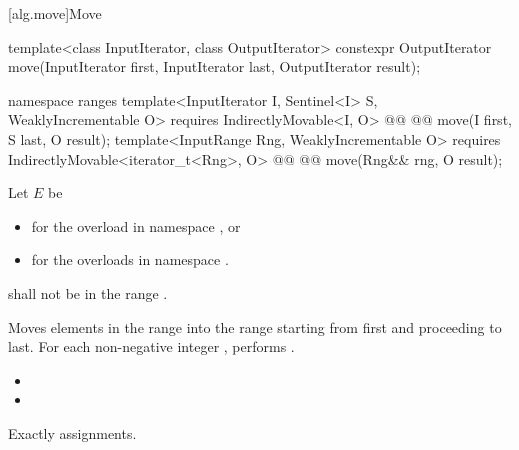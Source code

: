 [alg.move]{Move}

%
\begin{itemdecl}
template<class InputIterator, class OutputIterator>
  constexpr OutputIterator move(InputIterator first, InputIterator last,
                                OutputIterator result);
\end{itemdecl}
\begin{addedblock}
%
\begin{itemdecl}
namespace ranges {
  template<InputIterator I, Sentinel<I> S, WeaklyIncrementable O>
    requires IndirectlyMovable<I, O>
    @@
    @@
      move(I first, S last, O result);
  template<InputRange Rng, WeaklyIncrementable O>
    requires IndirectlyMovable<iterator_t<Rng>, O>
    @@
    @@
      move(Rng&& rng, O result);
}
\end{itemdecl}
\end{addedblock}

\begin{itemdescr}
{\color{newclr}
\pnum
Let $E$ be
\begin{itemize}
\item {} for the overload in namespace , or
\item {} for the overloads in namespace .
\end{itemize}
} %

\pnum
\requires
{}
shall not be in the range
.

\pnum
\effects
Moves elements in the range 
into the range 
starting from first and proceeding to last.
For each non-negative integer
 ,
performs
.

\pnum
\returns
\begin{itemize}
\item {} 
\item {} 
\end{itemize}

\pnum
\complexity
Exactly
 assignments.
\end{itemdescr}

